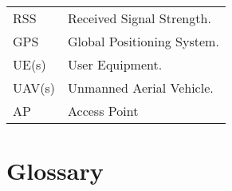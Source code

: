 \begin{longtable}[]{@{}ll@{}}
\begin{minipage}[t]{0.24\columnwidth}\raggedright
RSS\strut
\end{minipage} & \begin{minipage}[t]{0.71\columnwidth}\raggedright
Received Signal Strength.\strut
\end{minipage}\tabularnewline
\begin{minipage}[t]{0.24\columnwidth}\raggedright
GPS\strut
\end{minipage} & \begin{minipage}[t]{0.71\columnwidth}\raggedright
Global Positioning System.\strut
\end{minipage}\tabularnewline
\begin{minipage}[t]{0.24\columnwidth}\raggedright
UE(s)\strut
\end{minipage} & \begin{minipage}[t]{0.71\columnwidth}\raggedright
User Equipment.\strut
\end{minipage}\tabularnewline
\begin{minipage}[t]{0.24\columnwidth}\raggedright
UAV(s)\strut
\end{minipage} & \begin{minipage}[t]{0.71\columnwidth}\raggedright
Unmanned Aerial Vehicle.\strut
\end{minipage}\tabularnewline
\begin{minipage}[t]{0.24\columnwidth}\raggedright
AP\strut
\end{minipage} & \begin{minipage}[t]{0.71\columnwidth}\raggedright
Access Point\strut
\end{minipage}\tabularnewline
\bottomrule
\end{longtable}

\hypertarget{glossary-1}{%
\section{Glossary}\label{glossary-1}}

